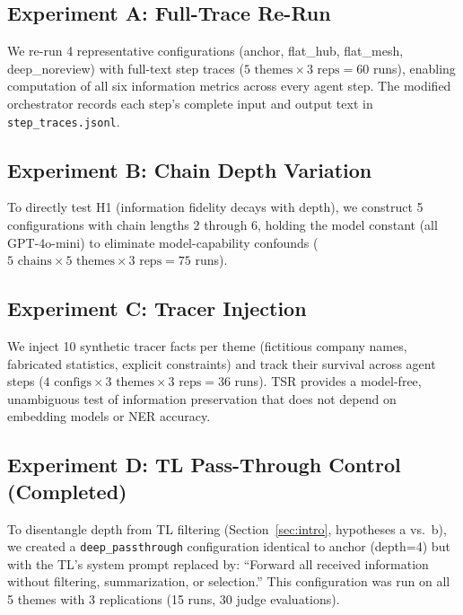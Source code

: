 \documentclass[conference]{IEEEtran}
\begin{document}
\subsection{Experiment A: Full-Trace Re-Run}

We re-run 4 representative configurations (anchor, flat\_hub, flat\_mesh, deep\_noreview) with full-text step traces ($5 \text{ themes} \times 3 \text{ reps} = 60$ runs), enabling computation of all six information metrics across every agent step.
The modified orchestrator records each step's complete input and output text in \texttt{step\_traces.jsonl}.

\subsection{Experiment B: Chain Depth Variation}

To directly test H1 (information fidelity decays with depth), we construct 5 configurations with chain lengths 2 through 6, holding the model constant (all GPT-4o-mini) to eliminate model-capability confounds ($5 \text{ chains} \times 5 \text{ themes} \times 3 \text{ reps} = 75$ runs).

\subsection{Experiment C: Tracer Injection}

We inject 10 synthetic tracer facts per theme (fictitious company names, fabricated statistics, explicit constraints) and track their survival across agent steps ($4 \text{ configs} \times 3 \text{ themes} \times 3 \text{ reps} = 36$ runs).
TSR provides a model-free, unambiguous test of information preservation that does not depend on embedding models or NER accuracy.

\subsection{Experiment D: TL Pass-Through Control (Completed)}
\label{subsec:exp_d}

To disentangle depth from TL filtering (Section~\ref{sec:intro}, hypotheses a vs.\ b), we created a \texttt{deep\_passthrough} configuration identical to anchor (depth=4) but with the TL's system prompt replaced by: ``Forward all received information without filtering, summarization, or selection.''
This configuration was run on all 5 themes with 3 replications (15 runs, 30 judge evaluations).
\end{document}

